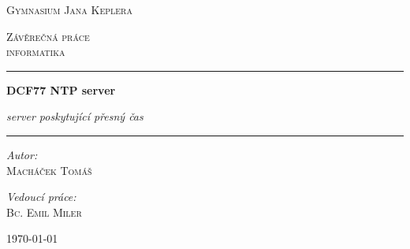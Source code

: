 \begin{titlepage}
    \begin{center}
        \vspace*{.06\textheight}

        \LARGE

        \textsc{Gymnasium Jana Keplera}

        \vspace{1.5cm}

        \Large

        \textsc{Závěrečná práce\\
        informatika}

        \vspace{1.5cm}

        \hrule

        \vspace{0.8cm}

        \LARGE
        \textbf{DCF77 NTP server}

        \vspace{0.2cm}
        \Large
        \emph{server poskytující přesný čas}

        \vspace{0.8cm}

        \hrule
        \vspace{2cm}

        \begin{minipage}[c]{0.4\textwidth}
            \begin{flushleft} \large
                \emph{Autor:}\\
                \textsc{Macháček Tomáš}
            \end{flushleft}
        \end{minipage}
        \begin{minipage}[c]{0.4\textwidth}
            \begin{flushright} \large
                \emph{Vedoucí práce:} \\
                \textsc{Bc. Emil Miler}
            \end{flushright}
        \end{minipage}

        \vspace{8cm}

        \today

        \vfill

    \end{center}
\end{titlepage}
